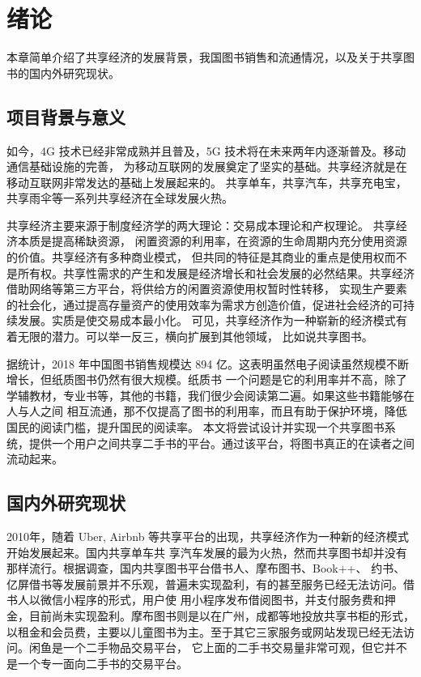 
\chapter{绪论}
本章简单介绍了共享经济的发展背景，我国图书销售和流通情况，以及关于共享图书的国内外研究现状。

\section{项目背景与意义}
    如今，4G 技术已经非常成熟并且普及，5G\cite{Wiki5G} 技术将在未来两年内逐渐普及。移动通信基础设施的完善，
    为移动互联网的发展奠定了坚实的基础。共享经济就是在移动互联网非常发达的基础上发展起来的。
    共享单车，共享汽车，共享充电宝，共享雨伞等一系列共享经济在全球发展火热。

    共享经济主要来源于制度经济学的两大理论：交易成本理论和产权理论\cite{share2018}。 共享经济本质是提高稀缺资源， 
    闲置资源的利用率\cite{SharingEconomy}，在资源的生命周期内充分使用资源的价值。共享经济有多种商业模式，
    但共同的特征是其商业的重点是使用权而不是所有权\cite{theory}。共享性需求的产生和发展是经济增长和社会发展的必然结果\cite{think}。共享经济借助网络等第三方平台，将供给方的闲置资源使用权暂时性转移，
    实现生产要素的社会化，通过提高存量资产的使用效率为需求方创造价值，促进社会经济的可持续发展\cite{reason}。实质是使交易成本最小化\cite{trade}。
    可见，共享经济作为一种崭新的经济模式有着无限的潜力。可以举一反三，横向扩展到其他领域，
    比如说共享图书。

    据统计\cite{BookSales}，2018 年中国图书销售规模达 894 亿。这表明虽然电子阅读虽然规模不断增长，但纸质图书仍然有很大规模。纸质书
    一个问题是它的利用率并不高，除了学辅教材，专业书等，其他的书籍，我们很少会阅读第二遍。如果这些书籍能够在人与人之间
    相互流通，那不仅提高了图书的利用率，而且有助于保护环境，降低国民的阅读门槛，提升国民的阅读率。
    本文将尝试设计并实现一个共享图书系统，提供一个用户之间共享二手书的平台。通过该平台，将图书真正的在读者之间流动起来。

\section{国内外研究现状}

    2010年，随着 Uber, Airbnb 等共享平台的出现，共享经济作为一种新的经济模式开始发展起来\cite{Airbnb}。国内共享单车共
    享汽车发展的最为火热，然而共享图书却并没有那样流行。根据调查，国内共享图书平台借书人、摩布图书、Book++、
    约书、亿屏借书等发展前景并不乐观，普遍未实现盈利，有的甚至服务已经无法访问。借书人以微信小程序的形式，用户使
    用小程序发布借阅图书，并支付服务费和押金，目前尚未实现盈利。摩布图书\cite{mobu}则是以在广州，成都等地投放共享书柜的形式，
    以租金和会员费，主要以儿童图书为主。至于其它三家服务或网站发现已经无法访问。闲鱼\cite{2taobao}是一个二手物品交易平台，
    它上面的二手书交易量非常可观，但它并不是一个专一面向二手书的交易平台。

